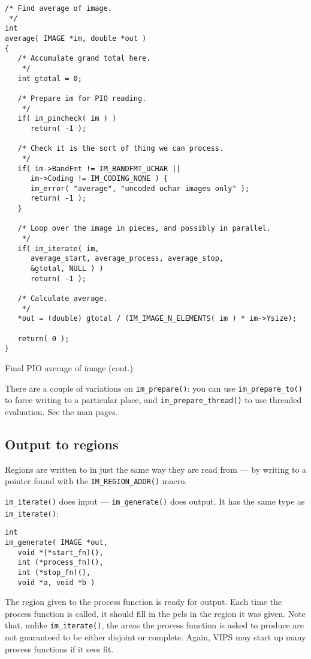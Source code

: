 \begin{fig2}
\begin{verbatim}
/* Find average of image.
 */
int
average( IMAGE *im, double *out )
{
   /* Accumulate grand total here.
    */
   int gtotal = 0;
   
   /* Prepare im for PIO reading.
    */
   if( im_pincheck( im ) )
      return( -1 );

   /* Check it is the sort of thing we can process.
    */
   if( im->BandFmt != IM_BANDFMT_UCHAR || 
      im->Coding != IM_CODING_NONE ) {
      im_error( "average", "uncoded uchar images only" );
      return( -1 );
   }

   /* Loop over the image in pieces, and possibly in parallel.
    */
   if( im_iterate( im, 
      average_start, average_process, average_stop,
      &gtotal, NULL ) )
      return( -1 );

   /* Calculate average.
    */
   *out = (double) gtotal / (IM_IMAGE_N_ELEMENTS( im ) * im->Ysize);

   return( 0 );
} 
\end{verbatim}
\caption{Final PIO average of image (cont.)}
\end{fig2}

There are a couple of variations on \verb+im_prepare()+: you can use
\verb+im_prepare_to()+ to force writing to a particular place, and
\verb+im_prepare_thread()+ to use threaded evaluation. See the man pages.

\subsection{Output to regions}
\label{sec:generate}

Regions are written to in just the same way they are read from --- by
writing to a pointer found with the \verb+IM_REGION_ADDR()+ macro.

\verb+im_iterate()+ does input --- \verb+im_generate()+ does output. It
has the same type as \verb+im_iterate()+:

\begin{verbatim}
int 
im_generate( IMAGE *out,
   void *(*start_fn)(), 
   int (*process_fn)(), 
   int (*stop_fn)(),
   void *a, void *b )    
\end{verbatim}

The region given to the process function is ready for output. Each time
the process function is called, it should fill in the pels in the region
it was given. Note that, unlike \verb+im_iterate()+, the areas the process
function is asked to produce are not guaranteed to be either disjoint or
complete. Again, VIPS may start up many process functions if it sees fit.

